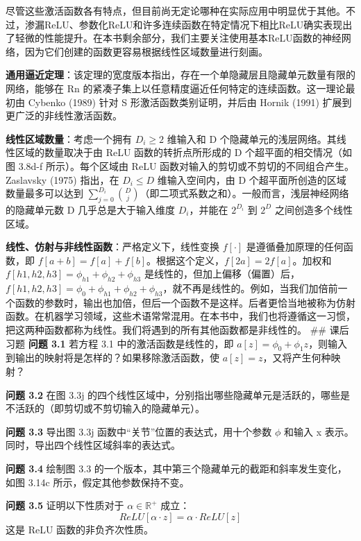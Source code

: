 尽管这些激活函数各有特点，但目前尚无定论哪种在实际应用中明显优于其他。不过，渗漏ReLU、参数化ReLU和许多连续函数在特定情况下相比ReLU确实表现出了轻微的性能提升。在本书剩余部分，我们主要关注使用基本ReLU函数的神经网络，因为它们创建的函数更容易根据线性区域数量进行刻画。

\textbf{通用逼近定理}：该定理的宽度版本指出，存在一个单隐藏层且隐藏单元数量有限的网络，能够在 Rn 的紧凑子集上以任意精度逼近任何特定的连续函数。这一理论最初由 Cybenko (1989) 针对 S 形激活函数类别证明，并后由 Hornik (1991) 扩展到更广泛的非线性激活函数。

\textbf{线性区域数量}：考虑一个拥有 \(D_i \geq 2\) 维输入和 D 个隐藏单元的浅层网络。其线性区域的数量取决于由 ReLU 函数的转折点所形成的 D 个超平面的相交情况（如图 3.8d-f 所示）。每个区域由 ReLU 函数对输入的剪切或不剪切的不同组合产生。Zaslavsky (1975) 指出，在 \(D_i \leq D\) 维输入空间内，由 D 个超平面所创造的区域数量最多可以达到 \(\sum_{j=0}^{D_i} \binom{D}{j}\)（即二项式系数之和）。一般而言，浅层神经网络的隐藏单元数 D 几乎总是大于输入维度 \(D_i\)，并能在 \(2^{D_i}\) 到 \(2^D\) 之间创造多个线性区域。

\textbf{线性、仿射与非线性函数}：严格定义下，线性变换 \(f[\cdot]\) 是遵循叠加原理的任何函数，即  \(f[a + b] = f[a] + f[b]\)。根据这个定义，\(f[2a] = 2f[a]\)。加权和 \(f[h1, h2, h3] = \phi_{h1} + \phi_{h2} + \phi_{h3}\) 是线性的，但加上偏移（偏置）后，\(f[h1, h2, h3] = \phi_0 + \phi_{h1} + \phi_{h2} + \phi_{h3}\)，就不再是线性的。例如，当我们加倍前一个函数的参数时，输出也加倍，但后一个函数不是这样。后者更恰当地被称为仿射函数。在机器学习领域，这些术语常常混用。在本书中，我们也将遵循这一习惯，把这两种函数都称为线性。我们将遇到的所有其他函数都是非线性的。
## 课后习题
\textbf{问题 3.1} 若方程 3.1 中的激活函数是线性的，即 \(a[z] = \phi_0 + \phi_{1}z\)，则输入到输出的映射将是怎样的？如果移除激活函数，使 \(a[z] = z\)，又将产生何种映射？

\textbf{问题 3.2} 在图 3.3j 的四个线性区域中，分别指出哪些隐藏单元是活跃的，哪些是不活跃的（即剪切或不剪切输入的隐藏单元）。

\textbf{问题 3.3} 导出图 3.3j 函数中“关节”位置的表达式，用十个参数 \(\phi\) 和输入 x 表示。同时，导出四个线性区域斜率的表达式。

\textbf{问题 3.4} 绘制图 3.3 的一个版本，其中第三个隐藏单元的截距和斜率发生变化，如图 3.14c 所示，假定其他参数保持不变。


\textbf{问题 3.5} 证明以下性质对于 \(\alpha \in \mathbb{R}^+\) 成立：
\[
ReLU[\alpha \cdot z] = \alpha \cdot ReLU[z] \tag{3.14}
\]
这是 ReLU 函数的非负齐次性质。

